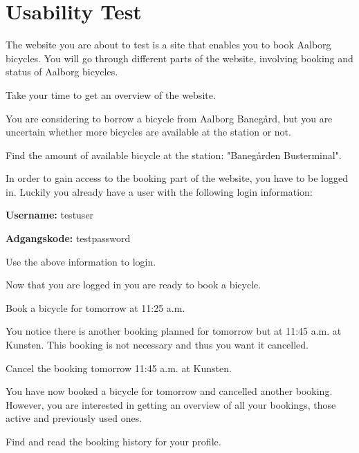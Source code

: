 \chapter{Usability Test}\label{app:usability-test}
	The website you are about to test is a site that enables you to book Aalborg bicycles.
	You will go through different parts of the website, involving booking and status of Aalborg bicycles.
	
	\begin{description}[style=nextline]
		\item[Establish an overview]
			Take your time to get an overview of the website.
		\item[Status for bicycle]
			You are considering to borrow a bicycle from Aalborg Banegård, but you are uncertain whether more bicycles are available at the station or not.
		
			Find the amount of available bicycle at the station: "Banegården Busterminal".
		\item[Booking - Login]
			In order to gain access to the booking part of the website, you have to be logged in.
			Luckily you already have a user with the following login information:
			
			\textbf{Username:} testuser
			
			\textbf{Adgangskode:} testpassword
			
			Use the above information to login.
		\item[Booking - Time and booking]
			 Now that you are logged in you are ready to book a bicycle.
			 
			 Book a bicycle for tomorrow at 11:25 a.m.
		\item[Cancel planned booking]
			 You notice there is another booking planned for tomorrow but at 11:45 a.m. at Kunsten.
			 This booking is not necessary and thus you want it cancelled.
			 
			 Cancel the booking tomorrow 11:45 a.m. at Kunsten.
		\item[Examine the booking history]
			You have now booked a bicycle for tomorrow and cancelled another booking.
			However, you are interested in getting an overview of all your bookings, those active and previously used ones.
			
			Find and read the booking history for your profile.
	\end{description}